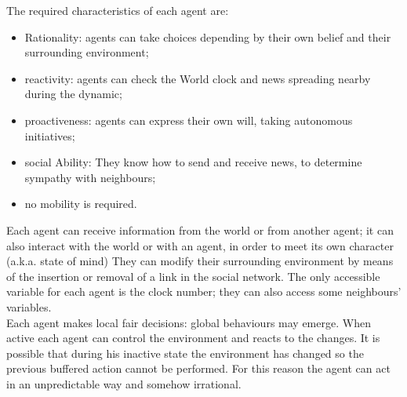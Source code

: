 \documentclass[11pt]{article} %
\begin{document}
The required characteristics of each agent are: \begin{itemize}
\item Rationality: agents can take choices depending by their own belief and their surrounding environment;
\item reactivity: agents can check the World clock and news spreading nearby during the dynamic;
\item proactiveness:  agents can express their own will, taking autonomous initiatives;
\item social Ability: They know how to send and receive news, to determine sympathy with neighbours;
\item no mobility is required. 


\end{itemize}

Each agent can receive information from the world or from another agent; it can also interact with 
the world or with an agent, in order to meet its own character (a.k.a. state of mind) 
They can  modify their surrounding environment by means of the insertion or removal of a link in the social network.
The only accessible variable for each agent is the clock number; they can also access some neighbours' variables.
\\

Each agent makes local fair decisions: global behaviours may emerge.
When active each agent can control the environment and reacts  to the changes. 
It is possible that during his inactive state the environment has changed so the previous buffered action cannot be performed.
For this reason the agent can act in an unpredictable way and somehow irrational.
\end{document}
